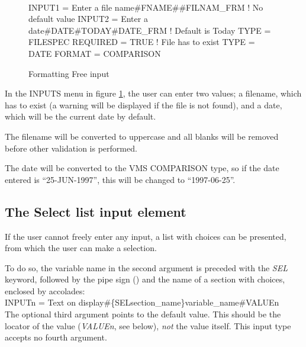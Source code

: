 \documentclass[a4paper]{book}
\renewcommand{\indent}{\hspace*{5mm}}
\begin{document}
\begin{figure}[ht]
\begin{minipage}[t]{\textwidth}
\hrulefill \\
\begin{ttfamily}
 \newline
\indent INPUT1 = Enter a file name{\#}FNAME{\#}{\#}FILNAM{\_}FRM ! No default value \newline
\indent INPUT2 = Enter a date{\#}DATE{\#}TODAY{\#}DATE{\_}FRM ! Default is Today \newline
 \newline
{} \newline
\indent TYPE = FILESPEC \newline
\indent REQUIRED = TRUE ! File has to exist \newline
 \newline
{} \newline
\indent TYPE = DATE \newline
\indent FORMAT = COMPARISON \newline
\end{ttfamily}
\caption{Formatting Free input}\label{fig:formatfree}
\hrulefill
\end{minipage}
\end{figure}

In the INPUTS menu in figure \ref{fig:formatfree}, the user can enter two values; a filename, which 
has to exist (a warning will be displayed if the file is not found), and a 
date, which will be the current date by default.

The filename will be converted to uppercase and all blanks will be removed 
before other validation is performed.

The date will be converted to the VMS COMPARISON type, so if the date 
entered is ``25-JUN-1997'', this will be changed to ``1997-06-25''.

\subsection{The Select list input element}
\label{subsubsec:mylabel39}

If the user cannot freely enter any input, a list with choices can be 
presented, from which the user can make a selection.

To do so, the variable name in the second argument is preceded with the \textsl{SEL} 
keyword, followed by the pipe sign (\textsl{\textbar}) and the name of a section 
with choices, enclosed by accolades: \\
\indent\textsf{INPUTn = Text on display{\#}{\{}SEL\textbar section{\_}name{\}}variable{\_}name{\#}VALUEn} \\
The optional third argument points to the default value. This should be the 
locator of the value (\textsl{VALUE\textit{n}}, see below), \textit{not} the value itself. This input type 
accepts no fourth argument.
\end{document}
